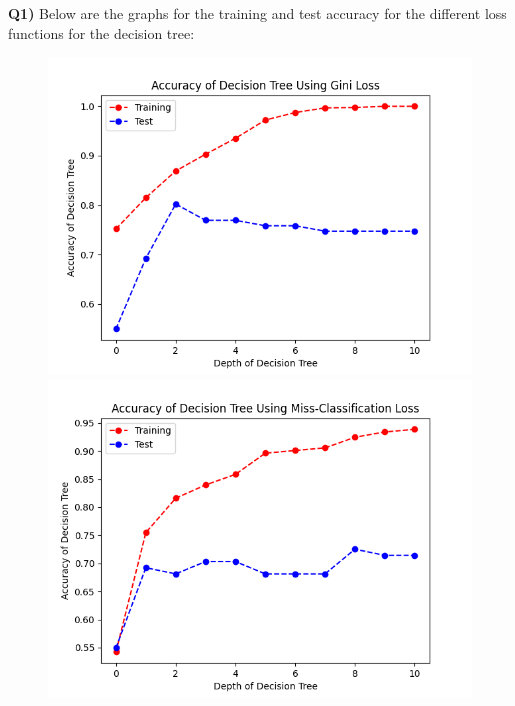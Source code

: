\documentclass{article}
\begin{document}
\begin{titlepage}
\vspace{0.5cm}
\textbf{Q1)} Below are the graphs for the training and test accuracy for the different loss functions for the decision tree:
\begin{figure}[!htb]
    \centering
    \begin{minipage}{.5\textwidth}
        \centering
        \includegraphics[width=\textwidth]{g1.png}
    \end{minipage}%
    \begin{minipage}{0.5\textwidth}
        \centering
        \includegraphics[width=\textwidth]{g2.png}
    \end{minipage}
\end{figure}
\begin{figure}[!htb]

\end{figure}
\end{titlepage}
\end{document}

